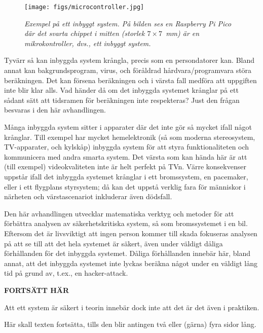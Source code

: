 \documentclass[svenska]{style/LTHthesis}
\begin{document}
\begin{figure}
    \vspace*{-2mm}
    \begin{centering}
        \texttt{[image: figs/microcontroller.jpg]}
    \end{centering}\small\par\medskip
        \noindent\emph{Exempel på ett inbyggt system. På bilden ses en Raspberry Pi Pico där det svarta chippet i mitten (storlek $7\times 7$~mm) är en mikrokontroller, dvs., ett inbyggt system.}\footnotemark
    \vspace*{-2mm}
\end{figure}

Tyvärr så kan inbyggda system krångla, precis som en persondatorer kan.
Bland annat kan bakgrundsprogram, virus, och föråldrad hårdvara/programvara störa beräkningen.
Det kan försena beräkningen och i värsta fall medföra att uppgiften inte blir klar alls.
Vad händer då om det inbyggda systemet krånglar på ett sådant sätt att tidsramen för beräkningen inte respekteras?
Just den frågan besvaras i den här avhandlingen.

Många inbyggda system sitter i apparater där det inte gör så mycket ifall något krånglar.
Till exempel har mycket hemelektronik (så som moderna stereosystem, TV-apparater, och kylskåp) inbyggda system för att styra funktionaliteten och kommunicera med andra smarta system.
Det värsta som kan hända här är att (till exempel) videokvaliteten inte är helt perfekt på TVn.
Värre konsekvenser uppstår ifall det inbyggda systemet krånglar i ett bromssystem, en pacemaker, eller i ett flygplans styrsystem; då kan det uppstå verklig fara för människor i närheten och värstascenariot inkluderar även dödsfall.

Den här avhandlingen utvecklar matematiska verktyg och metoder för att förbättra analysen av säkerhetskritiska system, så som bromssystemet i en bil.
Eftersom det är livsviktigt att ingen person kommer till skada fokuseras analysen på att se till att det hela systemet är säkert, även under väldigt dåliga förhållanden för det inbyggda systemet.
Dåliga förhållanden innebär här, bland annat, att det inbyggda systemet inte lyckas beräkna något under en väldigt lång tid på grund av, t.ex., en hacker-attack.

\textbf{FORTSÄTT HÄR}

Att ett system är säkert i teorin innebär dock inte att det är det även i praktiken.


Här skall texten fortsätta, tills den blir antingen två eller (gärna) fyra sidor lång.
\end{document}
